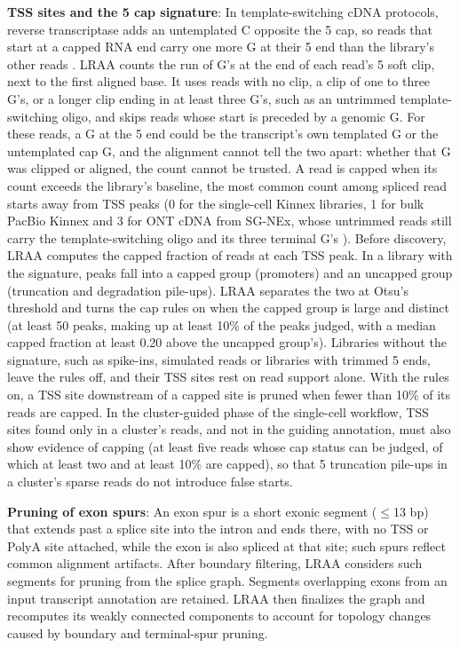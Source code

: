 \textbf{TSS sites and the 5\p{} cap signature}: In template-switching cDNA protocols, reverse transcriptase adds an untemplated C opposite the 5\p{} cap, so reads that start at a capped RNA end carry one more G at their 5\p{} end than the library's other reads \citep{wulf2019, cumbie2015}. LRAA counts the run of G's at the end of each read's 5\p{} soft clip, next to the first aligned base. It uses reads with no clip, a clip of one to three G's, or a longer clip ending in at least three G's, such as an untrimmed template-switching oligo, and skips reads whose start is preceded by a genomic G. For these reads, a G at the 5\p{} end could be the transcript's own templated G or the untemplated cap G, and the alignment cannot tell the two apart: whether that G was clipped or aligned, the count cannot be trusted. A read is capped when its count exceeds the library's baseline, the most common count among spliced read starts away from TSS peaks (0 for the single-cell Kinnex libraries, 1 for bulk PacBio Kinnex and 3 for ONT cDNA from SG-NEx, whose untrimmed reads still carry the template-switching oligo and its three terminal G's \citealp{an2025}). Before discovery, LRAA computes the capped fraction of reads at each TSS peak. In a library with the signature, peaks fall into a capped group (promoters) and an uncapped group (truncation and degradation pile-ups). LRAA separates the two at Otsu's threshold \citep{otsu1979} and turns the cap rules on when the capped group is large and distinct (at least 50 peaks, making up at least 10\% of the peaks judged, with a median capped fraction at least 0.20 above the uncapped group's). Libraries without the signature, such as spike-ins, simulated reads or libraries with trimmed 5\p{} ends, leave the rules off, and their TSS sites rest on read support alone. With the rules on, a TSS site downstream of a capped site is pruned when fewer than 10\% of its reads are capped. In the cluster-guided phase of the single-cell workflow, TSS sites found only in a cluster's reads, and not in the guiding annotation, must also show evidence of capping (at least five reads whose cap status can be judged, of which at least two and at least 10\% are capped), so that 5\p{} truncation pile-ups in a cluster's sparse reads do not introduce false starts.

\textbf{Pruning of exon spurs}: An exon spur is a short exonic segment ($\leq$13 bp) that extends past a splice site into the intron and ends there, with no TSS or PolyA site attached, while the exon is also spliced at that site; such spurs reflect common alignment artifacts. After boundary filtering, LRAA considers such segments for pruning from the splice graph. Segments overlapping exons from an input transcript annotation are retained. LRAA then finalizes the graph and recomputes its weakly connected components to account for topology changes caused by boundary and terminal-spur pruning.

